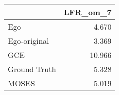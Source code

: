 \begin{tabular}{lr}
\toprule
{} & LFR_om_7 \\
\midrule
Ego          &    4.670 \\
Ego-original &    3.369 \\
GCE          &   10.966 \\
Ground Truth &    5.328 \\
MOSES        &    5.019 \\
\bottomrule
\end{tabular}
